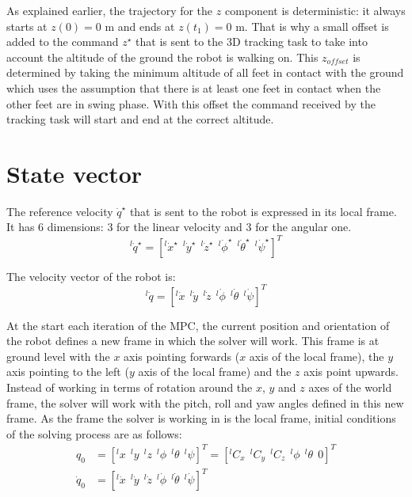 \documentclass[a4paper,11pt]{article}
\begin{document}
As explained earlier, the trajectory for the $z$ component is deterministic: it always starts at $z(0)=0$ m and ends at $z(t_1)=0$ m. That is why a small offset is added to the command $z^\star$ that is sent to the 3D tracking task to take into account the altitude of the ground the robot is walking on. This $z_{offset}$ is determined by taking the minimum altitude of all feet in contact with the ground which uses the assumption that there is at least one feet in contact when the other feet are in swing phase. With this offset the command received by the tracking task will start and end at the correct altitude.

\newpage
\section{State vector}


The reference velocity $\dot q^\star$ that is sent to the robot is expressed in its local frame. It has 6 dimensions: 3 for the linear velocity and 3 for the angular one.
\begin{equation}
{}^l\! \dot q^\star = [{}^l\! \dot x^\star ~~ {}^l\! \dot y^\star ~~ {}^l\! \dot z^\star ~~ {}^l\! \dot \phi^\star ~~ {}^l\! \dot \theta^\star ~~ {}^l\! \dot \psi^\star ]^T
\end{equation}

The velocity vector of the robot is:
\begin{equation}
{}^l\! \dot q = [{}^l\! \dot x ~~ {}^l\! \dot y ~~ {}^l\! \dot z ~~ {}^l\! \dot \phi ~~ {}^l\! \dot \theta ~~ {}^l\! \dot \psi ]^T
\end{equation}

At the start each iteration of the MPC, the current position and orientation of the robot defines a new frame in which the solver will work. This frame is at ground level with the $x$ axis pointing forwards ($x$ axis of the local frame), the $y$ axis pointing to the left ($y$ axis of the local frame) and the $z$ axis point upwards. Instead of working in terms of rotation around the $x$, $y$ and $z$ axes of the world frame, the solver will work with the pitch, roll and yaw angles defined in this new frame. As the frame the solver is working in is the local frame, initial conditions of the solving process are as follows:
\begin{align}
q_0 &= [{}^l\!x ~~ {}^l\!y ~~ {}^l\!z ~~ {}^l\! \phi ~~ {}^l\! \theta ~~ {}^l\! \psi ]^T = [ {}^l\!C_x ~~ {}^l\!C_y ~~ {}^l\!C_z ~~ {}^l\! \phi ~~ {}^l\! \theta ~~ 0]^T \\
\dot q_0 &= [{}^l\! \dot x ~~ {}^l\! \dot y ~~ {}^l\! \dot z ~~ {}^l\! \dot \phi ~~ {}^l\! \dot \theta ~~ {}^l\! \dot \psi ]^T
\end{align}
\end{document}
